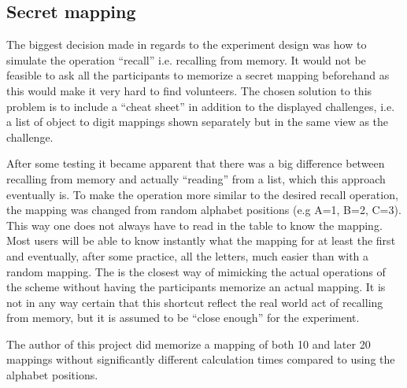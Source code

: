 \subsection{Secret mapping} The biggest decision made in regards to the experiment design was how to simulate the operation ``recall'' i.e. recalling from memory. It would not be feasible to ask all the participants to memorize a secret mapping beforehand as this would make it very hard to find volunteers. The chosen solution to this problem is to include a ``cheat sheet'' in addition to the displayed challenges, i.e. a list of object to digit mappings shown separately but in the same view as the challenge.
\par After some testing it became apparent that there was a big difference between recalling from memory and actually ``reading'' from a list, which this approach eventually is. To make the operation more similar to the desired recall operation, the mapping was changed from random alphabet positions (e.g A=1, B=2, C=3). This way one does not always have to read in the table to know the mapping. Most users will be able to know instantly what the mapping for at least the first and eventually, after some practice, all the letters, much easier than with a random mapping. The is the closest way of mimicking the actual operations of the scheme without having the participants memorize an actual mapping. It is not in any way certain that this shortcut reflect the real world act of recalling from memory, but it is assumed to be ``close enough'' for the experiment. 
\begin{remark}
The author of this project did memorize a mapping of both 10 and later 20 mappings without significantly different calculation times compared to using the alphabet positions.
\end{remark}

